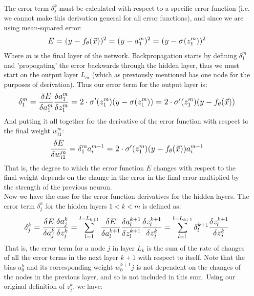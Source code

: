 \documentclass[12pt]{article}
\begin{document}
\\\newline The error term $\delta^k_j$ must be calculated with respect to a specific error function (i.e. we cannot make this derivation general for all error functions), and since we are using mean-squared error:
\begin{equation}
    \mathlarger{
        E = (y - f_{\theta}(\vec{x}))^2  = (y - a^m_1)^2 = (y-\sigma(z^m_1))^2
    }
\end{equation}
Where $m$ is the final layer of the network. Backpropagation starts by defining $\delta^m_1$ and 'propogating' the error backwards through the hidden layer, thus we must start on the output layer $L_m$ (which as previously mentioned has one node for the purposes of derivation). Thus our error term for the output layer is:
\begin{equation}
    \mathlarger{
        \delta^m_1 = \frac{\delta E}{\delta a^m_1}\frac{\delta  a^m_1}{\delta z^m_1} = 2\cdot\sigma'(z^m_1)(y-\sigma(z^m_1)) = 2\cdot\sigma'(z^m_1)(y - f_{\theta}(\vec{x}))
        }
\end{equation}
And putting it all together for the derivative of the error function with respect to the final weight $w^m_{i1}$:
\begin{equation}\label{Eq3}
    \mathlarger{
        \frac{\delta E}{\delta w^m_{i1}} =  \delta^m_1a^{m-1}_i = 2\cdot\sigma'(z^m_1)(y - f_{\theta}(\vec{x}))a^{m-1}_i
    }
\end{equation}
That is, the degree to which the error function $E$ changes with respect to the final weight depends on the change in the error in the final error multiplied by the strength of the previous neuron.
\\\newline Now we have the case for the error function derivatives for the hidden layers. The error term $\delta^k_j$ for the hidden layers $1 < k < m$ is defined as:
\begin{equation}
    \mathlarger{
        \delta^k_j = \frac{\delta E}{\delta a^k_j}\frac{\delta  a^k_j}{\delta z^k_j} = \sum\limits_{l=1}^{l=L_{k+1}}\frac{\delta E}{\delta a^{k+1}_l}\frac{\delta  a^{k+1}_l}{\delta z^{k+1}_l}\frac{\delta  z^{k+1}_l}{\delta z^k_j} = \sum\limits_{l=1}^{l=L_{k+1}}\delta^{k+1}_l\frac{\delta  z^{k+1}_l}{\delta z^k_j}
    }
\end{equation}
That is, the error term for a node $j$ in layer $L_k$ is the sum of the rate of changes of all the error terms in the next layer $k+1$ with respect to itself. Note that the bias $a^k_0$ and its corresponding weight $w^{k+1}_0j$ is not dependent on the changes of the nodes in the previous layer, and so is not included in this sum. Using our original definition of $z^k_j$, we have:
\end{document}
